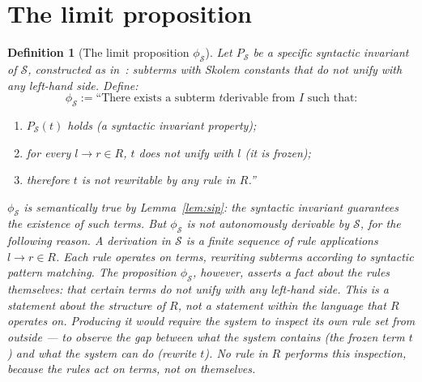 \documentclass[11pt]{article}
\newtheorem{definition}[theorem]{Definition}
\begin{document}
\section{The limit proposition}
\label{sec:limit-prop}


\begin{definition}[The limit proposition $\phi_{\mathcal{S}}$]
\label{def:limit-prop}
Let $P_{\mathcal{S}}$ be a specific syntactic invariant of $\mathcal{S}$,
constructed as in~\cite{buono2026sip}: subterms with Skolem constants
that do not unify with any left-hand side. Define:
\[
  \phi_{\mathcal{S}} := \text{``There exists a subterm } t \text{
  derivable from } I \text{ such that:}
\]
\begin{enumerate}
  \item $P_{\mathcal{S}}(t)$ holds (a syntactic invariant property);
  \item for every $l \to r \in R$, $t$ does not unify with $l$ (it is
        frozen);
  \item therefore $t$ is not rewritable by any rule in $R$.''
\end{enumerate}

$\phi_{\mathcal{S}}$ is \emph{semantically true} by
Lemma~\ref{lem:sip}: the syntactic invariant guarantees the existence of
such terms. But $\phi_{\mathcal{S}}$ is \emph{not autonomously
derivable} by $\mathcal{S}$, for the following reason. A derivation in
$\mathcal{S}$ is a finite sequence of rule applications
$l \to r \in R$. Each rule operates on terms, rewriting subterms
according to syntactic pattern matching. The proposition
$\phi_{\mathcal{S}}$, however, asserts a fact about the \emph{rules
themselves}: that certain terms do not unify with any left-hand side.
This is a statement about the structure of $R$, not a statement within
the language that $R$ operates on. Producing it would require the system
to inspect its own rule set from outside --- to observe the gap between
what the system contains (the frozen term $t$) and what the system can
do (rewrite $t$). No rule in $R$ performs this inspection, because the
rules act on terms, not on themselves.
\end{definition}
\end{document}
